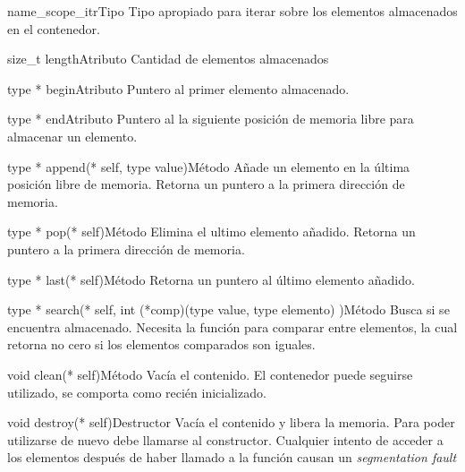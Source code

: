 \begin{apientry}{name\_scope\_itr}{Tipo}
    Tipo apropiado para iterar sobre los elementos almacenados en el contenedor. 
\end{apientry}

\begin{apientry}{size\_t length}{Atributo}
    Cantidad de elementos almacenados
\end{apientry}

\begin{apientry}{type * begin}{Atributo}
    Puntero al primer elemento almacenado.
\end{apientry}

\begin{apientry}{type * end}{Atributo}
    Puntero al la siguiente posición de memoria libre para almacenar un elemento.
\end{apientry}

\begin{apientry}{type * append(* self, type value)}{Método}
    Añade un elemento  en la última posición libre de memoria. Retorna un puntero a la primera dirección de memoria. 
\end{apientry}

\begin{apientry}{type * pop(* self)}{Método}
    Elimina el ultimo elemento añadido. Retorna un puntero a la primera dirección de memoria.
\end{apientry}

\begin{apientry}{type * last(* self)}{Método}
    Retorna un puntero al último elemento añadido. 
\end{apientry}

\begin{apientry}{type * search(* self, int (*comp)(type value, type elemento) )}{Método}
    Busca si  se encuentra almacenado. Necesita la función  para comparar entre elementos, la cual retorna no cero si los elementos comparados son iguales.  
\end{apientry}

\begin{apientry}{void clean(* self)}{Método}
    Vacía el contenido. El contenedor puede seguirse utilizado, se comporta como recién inicializado. 
\end{apientry}

\begin{apientry}{void destroy(* self)}{Destructor}
    Vacía el contenido y libera la memoria. Para poder utilizarse de nuevo debe llamarse al constructor. Cualquier intento de acceder a los elementos después de haber llamado a la función causan un \emph{segmentation fault}
\end{apientry}


